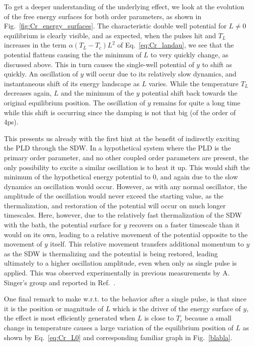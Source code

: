 To get a deeper understanding of the underlying effect, we look at the evolution of the free energy surfaces for both order parameters, as shown in Fig.~\ref{fig:Cr_energy_surfaces}.
The characteristic double well potential for $L\neq0$ equilibrium is clearly visible, and as expected, when the pulses hit and $T_L$ increases in the term $\alpha(T_L-T_c)L^2$ of Eq.~\ref{eq:Cr_landau}, we see that the potential flattens causing the the minimum of $L$ to very quickly change, as discussed above.
This in turn causes the single-well potential of $y$ to shift as quickly.
An oscillation of $y$ will occur due to its relatively slow dynamics, and instantaneous shift of its energy landscape as $L$ varies.
While the temperature $T_L$ decreases again, $L$ and the minimum of the $y$ potential shift back towards the original equilibrium position.
The oscillation of $y$ remains for quite a long time while this shift is occurring since the damping is not that big (of the order of 4ps).

This presents us already with the first hint at the benefit of indirectly exciting the PLD through the SDW.
In a hypothetical system where the PLD is the primary order parameter, and no other coupled order parameters are present, the only possibility to excite a similar oscillation is to heat it up.
This would shift the minimum of the hypothetical energy potential to 0, and again due to the slow dynamics an oscillation would occur.
However, as with any normal oscillator, the amplitude of the oscillation would never exceed the starting value, as the thermalization, and restoration of the potential will occur on much longer timescales.
Here, however, due to the relatively fast thermalization of the SDW with the bath, the potential surface for $y$ recovers on a faster timescale than it would on its own, leading to a relative movement of the potential opposite to the movement of $y$ itself.
This relative movement transfers additional momentum to $y$ as the SDW is thermalizing and the potential is being restored, leading ultimately to a higher oscillation amplitude, even when only as single pulse is applied.
This was observed experimentally in previous measurements by A. Singer's group and reported in Ref.~\cite{Singer2015}. 

One final remark to make w.r.t. to the behavior after a single pulse, is that since it is the position or magnitude of $L$ which is the driver of the energy surface of $y$, the effect is most efficiently generated when $L$ is close to $T_c$ because a small change in temperature causes a large variation of the equilibrium position of $L$ as shown by Eq.~\ref{eq:Cr_L0} and corresponding familiar graph in Fig.~\ref{blabla}.    

